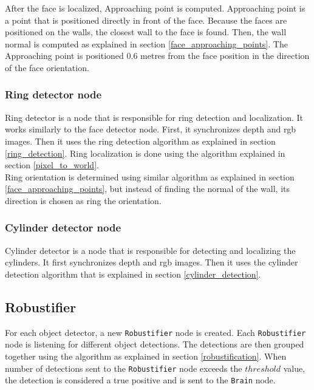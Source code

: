 \documentclass[12pt,a4paper]{article}
\begin{document}
	After the face is localized, Approaching point is computed. Approaching point is a point that is positioned directly in front of the face. Because the faces are positioned on the walls, the closest wall to the face is found. Then, the wall normal is computed as explained in section \ref{face_approaching_points}. The Approaching point is positioned 0.6 metres from the face position in the direction of the face orientation. \\

	\subsubsection{Ring detector node}
	Ring detector is a node that is responsible for ring detection and localization. It works similarly to the face detector node. First, it synchronizes depth and rgb images. Then it uses the ring detection algorithm as explained in section \ref{ring_detection}. Ring localization is done using the algorithm explained in section \ref{pixel_to_world}. \\
	
	Ring orientation is determined using similar algorithm as explained in section \ref{face_approaching_points}, but instead of finding the normal of the wall, its direction is chosen as ring the orientation. \\
	
	\subsubsection{Cylinder detector node}
	Cylinder detector is a node that is responsible for detecting and localizing the cylinders. It first synchronizes depth and rgb images. Then it uses the cylinder detection algorithm that is explained in section \ref{cylinder_detection}.

	\subsection{Robustifier}
	For each object detector, a new \texttt{Robustifier} node is created. Each \texttt{Robustifier} node is listening for different object detections. The detections are then grouped together using the algorithm as explained in section \ref{robustification}. When number of detections sent to the \texttt{Robustifier} node exceeds the $threshold$ value, the detection is considered a true positive and is sent to the \texttt{Brain} node. \\
	
\end{document}
